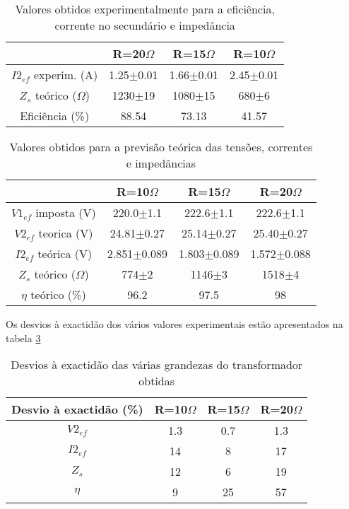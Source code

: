 \documentclass[%
  reprint,
  nofootinbib,
  amsmath,amssymb,
  aps,
  10pt,
]{revtex4-1}
\begin{document}
\begin{table}[h]
\begin{tabular}{c|c|c|c}
                         & R=20$\Omega$  & R=15$\Omega$  & R=10$\Omega$  \\ \hline
$I2_{ef}$ experim. (A)   & 1.25$\pm$0.01 & 1.66$\pm$0.01 & 2.45$\pm$0.01 \\ \hline
$Z_s$ teórico ($\Omega$) & 1230$\pm$19   & 1080$\pm$15   & 680$\pm$6     \\ \hline
Eficiência (\%)          & 88.54         & 73.13         & 41.57        
\end{tabular}
\caption{Valores obtidos experimentalmente para a eficiência, corrente no secundário e impedância}
\label{tab:imp}
\end{table}



\begin{table}[h]
\begin{tabular}{c|c|c|c}
                         & R=10$\Omega$    & R=15$\Omega$    & R=20$\Omega$    \\ \hline
$V1_{ef}$ imposta (V)    & 220.0$\pm$1.1   & 222.6$\pm$1.1   & 222.6$\pm$1.1   \\ \hline
$V2_{ef}$ teorica (V)    & 24.81$\pm$0.27  & 25.14$\pm$0.27  & 25.40$\pm$0.27  \\ \hline
$I2_{ef}$ teórica (V)    & 2.851$\pm$0.089 & 1.803$\pm$0.089 & 1.572$\pm$0.088 \\ \hline
$Z_s$ teórico ($\Omega$) & 774$\pm$2       & 1146$\pm$3      & 1518$\pm$4     \\ \hline
$\eta$ teórico (\%) &96.2&97.5&98
\end{tabular}
\caption{Valores obtidos para a previsão teórica das tensões, correntes e impedâncias}
\label{tab:carga}
\end{table}
Os desvios à exactidão dos vários valores experimentais estão apresentados na tabela \ref{tab:exac}
\begin{table}[h]
\begin{tabular}{c|c|c|c}
Desvio à exactidão (\%) & R=10$\Omega$ & R=15$\Omega$ & R=20$\Omega$ \\ \hline
$V2_{ef}$               & 1.3          & 0.7          & 1.3          \\ \hline
$I2_{ef}$               & 14           & 8            & 17           \\ \hline
$Z_s$                   & 12           & 6            & 19           \\ \hline
$\eta$                 &9           &25           &57
\end{tabular}
\caption{Desvios à exactidão das várias grandezas do transformador obtidas}
\label{tab:exac}
\end{table}
\end{document}
